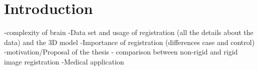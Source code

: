 \documentclass[../structure.tex]{subfiles}
\begin{document}
\chapter{Introduction}

-complexity of brain
-Data set and usage of registration (all the details about the data) and the 3D model
-Importance of registration (differences case and control)
-motivation/Proposal of the thesis - comparison between non-rigid and rigid image registration 
-Medical application
\end{document}

